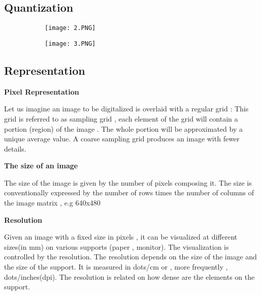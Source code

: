 \documentclass{article}
\begin{document}
\vspace{50mm}
\subsection{Quantization}

    
\begin{figure}[ht!]
  \centering
  \begin{subfigure}[b]{0.6\linewidth}
    \texttt{[image: 2.PNG]}
  \end{subfigure}
     \begin{subfigure}[b]{0.3\textwidth}
         \centering
         \texttt{[image: 3.PNG]}
     \end{subfigure}
\end{figure}


\subsection{Representation}


\textbf{Pixel Representation}
\vspace{2mm}

Let us imagine an image to be digitalized is overlaid with a regular grid : This grid is referred to as sampling grid , each element of the grid will contain a portion (region) of the image . The whole portion will be approximated by a unique average value. A coarse sampling grid produces an image with fewer details. 
 \vspace{2mm}
 
 \textbf{The size of an image}
 \vspace{2mm}
 
 The size of the image is given by the number of pixels composing it. The size is conventionally expressed by the number of rows times the number of columns of the image matrix , e.g 640x480
 \vspace{2mm}
 
 \textbf{Resolution}
 \vspace{2mm}
 
 Given an image with a fixed size in pixels , it can be visualized at different sizes(in mm) on various supports (paper , monitor). The visualization is controlled by the resolution.
 The resolution depends on the size of the image and the size of the support.
 It is measured in dots/cm or , more frequently , dots/inches(dpi).
 The resolution is related on how dense are the elements on the support.
 \vspace{2mm}
 
\end{document}
